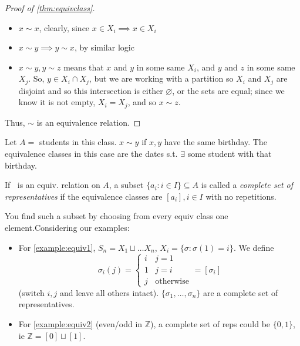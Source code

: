 \documentclass[12pt,oneside]{article}
\begin{document}
\begin{proof}[Proof of \cref{thm:equivclass}]
 \begin{itemize}
  \item $x\sim x$, clearly, since $x \in X_i \implies x \in X_i$
  \item $x \sim y \implies y \sim x$, by similar logic
  \item $x \sim y, y \sim z$ means that $x$ and $y$ in some same $X_i$, and $y$ and $z$ in some same $X_j$. So, $y \in X_i \cap X_j$, but we are working with a partition so $X_i$ and $X_j$ are disjoint and so this intersection is either $\varnothing$, or the sets are equal; since we know it is not empty, $X_i = X_j$, and so $x \sim z$.
 \end{itemize}

 Thus, $\sim$ is an equivalence relation.\footnotemark
\end{proof}

\begin{example}
  Let $A = $ students in this class. $x \sim y$ if $x, y$ have the same birthday. The equivalence classes in this case are the dates s.t. $\exists$ some student with that birthday.
\end{example}

\begin{definition}
  If $~$ is an equiv. relation on $A$, a subset $\{a_i : i \in I\}\subseteq A$ is called a \emph{complete set of representatives} if the equivalence classes are $[a_i], i \in I$ with no repetitions.

  You find such a subset by choosing from every equiv class one element.Considering our examples:
  \begin{itemize}
    \item For \cref{example:equiv1}, $S_n = X_1 \sqcup \dots X_n$, $X_i = \{\sigma : \sigma(1) = i\}$. We define \[\sigma_i (j) = \begin{cases}
      i & j = 1\\
      1 & j = i\\
      j & \text{otherwise} 
    \end{cases} = [\sigma_i]\] (switch $i,j$ and leave all others intact). $\{\sigma_1, \dots, \sigma_n\}$ are a complete set of representatives.
    \item For \cref{example:equiv2} (even/odd in $\mathbb{Z}$), a complete set of reps could be $\{0,1\}$, ie $\mathbb{Z} = [0] \sqcup [1]$.
\end{itemize}
\end{definition}
\end{document}
